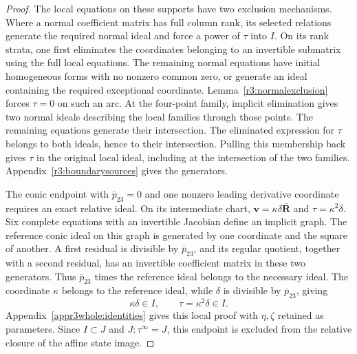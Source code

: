 \documentclass[11pt,a4paper]{article}
\numberwithin{equation}{section}
\theoremstyle{plain}
\theoremstyle{definition}
\theoremstyle{remark}
\begin{document}
\begin{proof}
The local equations on these supports have two exclusion mechanisms.
Where a normal coefficient matrix has full column rank, its selected
relations generate the required normal ideal and force a power of
$\tau$ into $I$. On its rank strata, one first eliminates the coordinates belonging
to an invertible submatrix using the full local equations. The remaining normal equations
have initial homogeneous forms with no nonzero common zero, or
generate an ideal containing the required exceptional coordinate.
Lemma~\ref{r3:normalexclusion} forces $\tau=0$ on such an arc.
At the four-point family, implicit elimination gives two normal
ideals describing the local families through those points. The
remaining equations generate their intersection. The eliminated
expression for $\tau$ belongs to both ideals, hence to their
intersection. Pulling this membership back gives $\tau$ in the
original local ideal, including at the intersection of the two
families. Appendix~\ref{r3:boundarysources} gives the generators.

The conic endpoint with $\overline p_{23}=0$ and one nonzero
leading derivative coordinate requires an exact relative ideal.
On its intermediate chart,
$\boldsymbol v=\kappa\delta\overline{\boldsymbol R}$ and
$\tau=\kappa^2\delta$. Six complete equations with an invertible
Jacobian define an implicit graph. The reference conic ideal on
this graph is generated by one coordinate and the square of
another. A first residual is divisible by $\overline p_{23}$,
and its regular quotient, together with a second residual,
has an invertible coefficient matrix in these two generators.
Thus $\overline p_{23}$ times the reference ideal belongs to the
necessary ideal. The coordinate $\kappa$ belongs to the reference
ideal, while $\delta$ is divisible by $\overline p_{23}$, giving
\[
 \kappa\delta\in I,\qquad \tau=\kappa^2\delta\in I.
\]
Appendix~\ref{appr3whole:identities} gives this local proof with
$\eta,\zeta$ retained as parameters. Since $I\subset J$ and
$J:\tau^\infty=J$, this endpoint is excluded from the relative
closure of the affine state image.


\end{proof}
\end{document}
